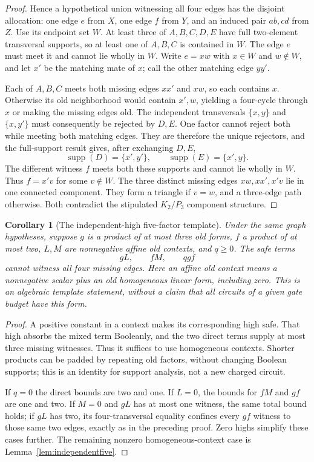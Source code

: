 \documentclass[11pt]{article}
\newcommand{\supp}{\operatorname{supp}}
\newtheorem{corollary}[theorem]{Corollary}
\theoremstyle{definition}
\theoremstyle{remark}
\begin{document}
\begin{proof}
Hence a hypothetical union witnessing all four edges has the disjoint allocation: one edge $e$ from $X$, one edge $f$ from $Y$, and an induced pair $ab,cd$ from $Z$. Use its endpoint set $W$. At least three of $A,B,C,D,E$ have full two-element transversal supports, so at least one of $A,B,C$ is contained in $W$. The edge $e$ must meet it and cannot lie wholly in $W$. Write $e=xw$ with $x\in W$ and $w\notin W$, and let $x'$ be the matching mate of $x$; call the other matching edge $yy'$.

Each of $A,B,C$ meets both missing edges $xx'$ and $xw$, so each contains $x$. Otherwise its old neighborhood would contain $x',w$, yielding a four-cycle through $x$ or making the missing edges old. The independent transversals $\{x,y\}$ and $\{x,y'\}$ must consequently be rejected by $D,E$. One factor cannot reject both while meeting both matching edges. They are therefore the unique rejectors, and the full-support result gives, after exchanging $D,E$,
\[
 \supp(D)=\{x',y'\},\qquad \supp(E)=\{x',y\}.
\]
The different witness $f$ meets both these supports and cannot lie wholly in $W$. Thus $f=x'v$ for some $v\notin W$. The three distinct missing edges $xw,xx',x'v$ lie in one connected component. They form a triangle if $v=w$, and a three-edge path otherwise. Both contradict the stipulated $K_2/P_3$ component structure.
\end{proof}

\begin{corollary}[The independent-high five-factor template]\label{cor:independentfive}
Under the same graph hypotheses, suppose $g$ is a product of at most three old forms, $f$ a product of at most two, $L,M$ are nonnegative affine old contexts, and $q\ge0$. The safe terms
\[
 gL,\qquad fM,\qquad qgf
\]
cannot witness all four missing edges. Here an affine old context means a nonnegative scalar plus an old homogeneous linear form, including zero. This is an algebraic template statement, without a claim that all circuits of a given gate budget have this form.
\end{corollary}
\begin{proof}
A positive constant in a context makes its corresponding high safe. That high absorbs the mixed term Booleanly, and the two direct terms supply at most three missing witnesses. Thus it suffices to use homogeneous contexts. Shorter products can be padded by repeating old factors, without changing Boolean supports; this is an identity for support analysis, not a new charged circuit.

If $q=0$ the direct bounds are two and one. If $L=0$, the bounds for $fM$ and $gf$ are one and two. If $M=0$ and $gL$ has at most one witness, the same total bound holds; if $gL$ has two, its four-transversal equality confines every $gf$ witness to those same two edges, exactly as in the preceding proof. Zero highs simplify these cases further. The remaining nonzero homogeneous-context case is Lemma~\ref{lem:independentfive}.
\end{proof}
\end{document}
